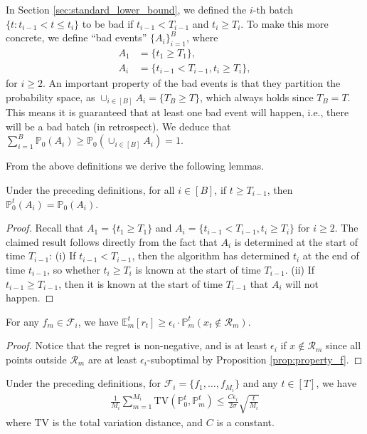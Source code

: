 \documentclass[10pt]{article}
\begin{document}
In Section \ref{sec:standard_lower_bound}, we defined the $i$-th batch $\{t: t_{i-1} < t \leq t_i \}$ to be bad if $t_{i-1}<T_{i-1} $ and $t_i\geq T_i$. 
To make this more concrete, we define ``bad events'' $\{A_i\}_{i=1}^B $, where
\begin{align}
    A_1 & =\{t_1\geq T_1 \}, \\
    A_i & =\{t_{i-1}<T_{i-1},t_i\geq T_{i} \},
\end{align}
for $i\geq 2$. An important property of the bad events is that they partition the probability space, 
as $\cup_{i\in[B]} A_i = \{T_B \geq T\}$, which always holds since $T_B = T$. This means it is guaranteed that at least one bad event will happen, i.e., there will be a bad batch (in retrospect). We deduce that $\sum_{i=1}^B \mathbb{P}_0(A_i) \geq \mathbb{P}_0(\cup_{i\in[B]}A_i)=1$.

From the above definitions we derive the following lemmas.

\begin{lemma}
    \label{lem:aux_bad_event}
    Under the preceding definitions, for all $i\in[B]$, if $t \geq T_{i-1}$, then $\mathbb{P}_0^t(A_i) =  \mathbb{P}_0(A_i)$.
\end{lemma}
\begin{proof}
    Recall that $A_1=\{t_1\geq T_1 \} $ and $A_i=\{t_{i-1}<T_{i-1},t_i\geq T_{i} \}$ for $i\geq 2$.
    The claimed result follows directly from the fact that $A_i$ is determined at the start of time $T_{i-1} $: (i) If $t_{i-1}<T_{i-1}$, 
    then the algorithm has determined $t_i$ at the end of time $t_{i-1}$, so whether $t_i \geq T_i$ is known at the start of time $T_{i-1}$.
    (ii) If $t_{i-1}\geq T_{i-1}$, then it is known at the start of time $T_{i-1}$ that $A_i$ will not happen.  
\end{proof}

\begin{lemma}
    \label{lem:aux_simple_regret}
    For any $f_{m}\in\mathcal{F}_{i}$, we have $\mathbb{E}_m^t[r_t] \geq\epsilon_i \cdot \mathbb{P}_m^t(x_t \notin \mathcal{R}_m)$.
\end{lemma}
\begin{proof}
    Notice that the regret is non-negative, and is at least $\epsilon_i$ if $x\notin \mathcal{R}_m$ since all points outside $\mathcal{R}_m$ are at least $\epsilon_i$-suboptimal by Proposition \ref{prop:property_f}.
\end{proof}

\begin{lemma}
    \label{lem:aux_avg_tv_bound}
    Under the preceding definitions,
    for $\mathcal{F}_{i} = \{f_1,\ldots,f_{M_i}\}$ and any $t\in[T]$, we have
    \begin{align}
        \frac{1}{M_i}\sum_{m=1}^{M_i}\mathrm{TV}(\mathbb{P}_0^{t}, \mathbb{P}_m^{t})
        \leq \frac{C\epsilon_i}{2\sigma} \sqrt{\frac{t}{M_i}}
    \end{align}
    where $\mathrm{TV}$ is the total variation distance,
    and $C$ is a constant.
\end{lemma}
\end{document}
